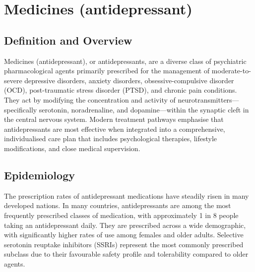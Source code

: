 \chapter{Medicines (antidepressant)}

\section*{Definition and Overview}
Medicines (antidepressant), or antidepressants, are a diverse class of psychiatric pharmacological agents primarily prescribed for the management of moderate-to-severe depressive disorders, anxiety disorders, obsessive-compulsive disorder (OCD), post-traumatic stress disorder (PTSD), and chronic pain conditions. They act by modifying the concentration and activity of neurotransmitters---specifically serotonin, noradrenaline, and dopamine---within the synaptic cleft in the central nervous system. Modern treatment pathways emphasise that antidepressants are most effective when integrated into a comprehensive, individualised care plan that includes psychological therapies, lifestyle modifications, and close medical supervision.

\section*{Epidemiology}
The prescription rates of antidepressant medications have steadily risen in many developed nations. In many countries, antidepressants are among the most frequently prescribed classes of medication, with approximately 1 in 8 people taking an antidepressant daily. They are prescribed across a wide demographic, with significantly higher rates of use among females and older adults. Selective serotonin reuptake inhibitors (SSRIs) represent the most commonly prescribed subclass due to their favourable safety profile and tolerability compared to older agents.


